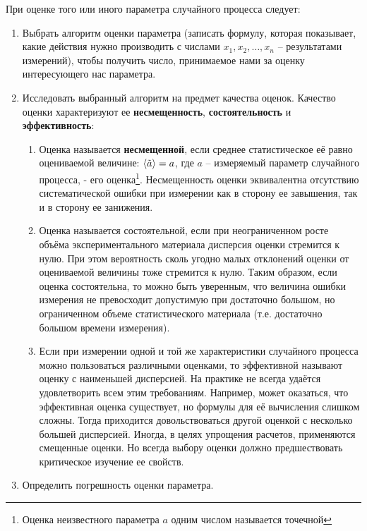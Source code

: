 При оценке того или иного параметра случайного процесса следует:
\begin{enumerate}
    \item Выбрать алгоритм оценки параметра (записать формулу, которая показывает, какие действия нужно производить с числами $x_{1},x_{2},\dots,x_n$ -- результатами измерений), чтобы получить число, принимаемое нами за оценку интересующего нас параметра.
    \item Исследовать выбранный алгоритм на предмет качества оценок. Качество оценки характеризуют ее \textbf{несмещенность}, \textbf{состоятельность} и \textbf{эффективность}:
    \begin{enumerate}
        \item Оценка называется \textbf{несмещенной}, если среднее статистическое её равно оцениваемой величине:  $\langle\tilde a\rangle = a$, где $a$ -- измеряемый параметр случайного процесса,  - его оценка\footnote{Оценка неизвестного параметра $a$ одним числом называется точечной}. Несмещенность оценки эквивалентна отсутствию систематической ошибки при измерении как в сторону ее завышения, так и в сторону ее занижения.
    \item Оценка называется состоятельной, если при неограниченном росте объёма экспериментального материала дисперсия оценки стремится к нулю. При этом вероятность сколь угодно малых отклонений оценки от оцениваемой величины тоже стремится к нулю. Таким образом, если оценка состоятельна, то можно быть уверенным, что величина ошибки измерения не превосходит допустимую при достаточно большом, но ограниченном объеме статистического материала (т.е. достаточно большом времени измерения).
    \item Если при измерении одной и той же характеристики случайного процесса можно пользоваться различными оценками, то эффективной называют оценку с наименьшей дисперсией. На практике не всегда удаётся удовлетворить всем этим требованиям. Например, может оказаться, что эффективная оценка существует, но формулы для её вычисления слишком сложны. Тогда приходится довольствоваться другой оценкой с несколько большей дисперсией. Иногда, в целях упрощения расчетов, применяются смещенные оценки. Но всегда выбору оценки должно предшествовать критическое изучение ее свойств.
    \end{enumerate}
\item Определить погрешность оценки параметра. 
\end{enumerate}
